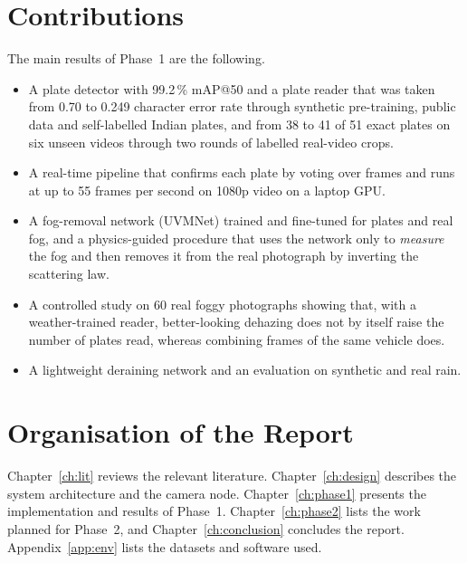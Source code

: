\section{Contributions}

The main results of Phase~1 are the following.
\begin{itemize}
  \item A plate detector with 99.2\,\% mAP@50 and a plate reader that was
        taken from 0.70 to 0.249 character error rate through synthetic
        pre-training, public data and self-labelled Indian plates, and from
        38 to 41 of 51 exact plates on six unseen videos through two rounds of
        labelled real-video crops.
  \item A real-time pipeline that confirms each plate by voting over frames and
        runs at up to 55 frames per second on 1080p video on a laptop GPU.
  \item A fog-removal network (UVMNet) trained and fine-tuned for plates and
        real fog, and a physics-guided procedure that uses the network only to
        \emph{measure} the fog and then removes it from the real photograph
        by inverting the scattering law.
  \item A controlled study on 60 real foggy photographs showing that, with a
        weather-trained reader, better-looking dehazing does not by itself
        raise the number of plates read, whereas combining frames of the same
        vehicle does.
  \item A lightweight deraining network and an evaluation on synthetic and real
        rain.
\end{itemize}

\section{Organisation of the Report}

Chapter~\ref{ch:lit} reviews the relevant literature. Chapter~\ref{ch:design}
describes the system architecture and the camera node. Chapter~\ref{ch:phase1}
presents the implementation and results of Phase~1. Chapter~\ref{ch:phase2}
lists the work planned for Phase~2, and Chapter~\ref{ch:conclusion} concludes
the report. Appendix~\ref{app:env} lists the datasets and software used.
